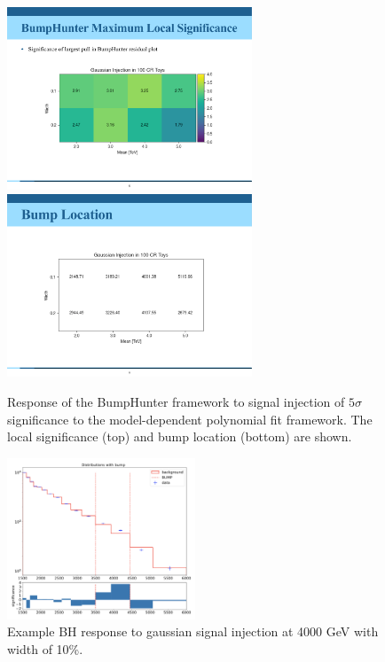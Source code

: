 \begin{figure}[!htbp]
\centering
   \includegraphics[width=0.65\textwidth]{figures/stats/siginj_bh_localsig.pdf}
   \includegraphics[width=0.65\textwidth]{figures/stats/siginj_bh_bumploc.pdf}
    \caption{Response of the BumpHunter framework to signal injection of $5\sigma$ significance to the model-dependent polynomial fit framework. The local significance (top) and bump location (bottom) are shown.
    \label{fig:siginj_bh}}
\end{figure}

\begin{figure}[!htbp]
\centering
   \includegraphics[width=0.5\textwidth]{figures/stats/bh_bump_example}
    \caption{Example BH response to gaussian signal injection at 4000 GeV with width of 10\%. 
    \label{fig:bh_bump_example}}
\end{figure}

